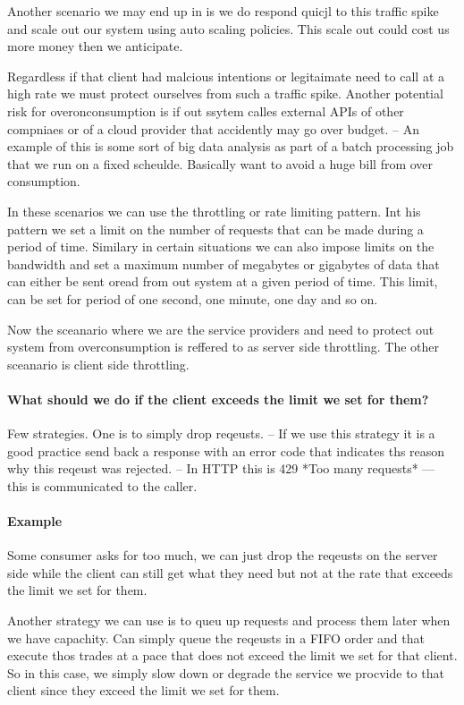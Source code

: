 \documentclass[a4paper, 11pt]{book}
\begin{document}
{    Another scenario we may end up in is we do respond quicjl to this traffic spike and scale out our system using auto scaling policies.
    This scale out could cost us more money then we anticipate.

    Regardless if that client had malcious intentions or legitaimate need to call at a high rate we must protect ourselves from such a traffic spike.
    Another potential risk for overonconsumption is if out ssytem calles external APIs of other compniaes or of a cloud provider that accidently may go over budget.
    -- An example of this is some sort of big data analysis as part of a batch processing job that we run on a fixed scheulde.
    Basically want to avoid a huge bill from over consumption.

    In these scenarios we can use the throttling or rate limiting pattern.
    Int his pattern we set a limit on the number of requests that can be made during a period of time.
    Similary in certain situations we can also impose limits on the bandwidth and set a maximum number of megabytes or gigabytes of data that can either be sent oread from out system at a given period of time.
    This limit, can be set for period of one second, one minute, one day and so on.

    Now the sceanario where we are the service providers and need to protect out system from overconsumption is reffered to as server side throttling.
    The other sceanario is client side throttling.

    \paragraph{What should we do if the client exceeds the limit we set for them?}
    Few strategies.
    One is to simply drop reqeusts.
    -- If we use this strategy it is a good practice send back a response with an error code that indicates ths reason why this reqeust was rejected.
    -- In HTTP this is 429 *Too many requests* --- this is communicated to the caller.

    \paragraph{Example}
    Some consumer asks for too much, we can just drop the reqeusts on the server side while the client can still get what they need but not at the rate that exceeds the limit we set for them.

    Another strategy we can use is to queu up requests and process them later when we have capachity.
    Can simply queue the reqeusts in a FIFO order and that execute thos trades at a pace that does not exceed the limit we set for that client.
    So in this case, we simply slow down or degrade the service we procvide to that client since they exceed the limit we set for them.

}
\end{document}

